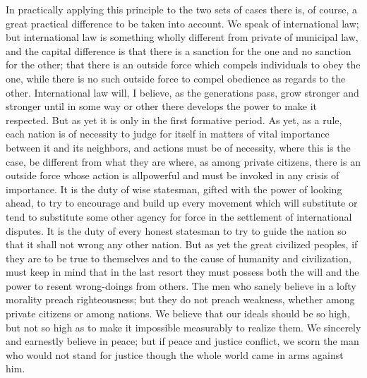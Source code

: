 \documentclass{scrbook}
\begin{document}
In practically applying this principle to the two sets of cases there is, of course, a great
practical difference to be taken into account. We speak of international law; but international law is something wholly different from private of municipal law, and the capital
difference is that there is a sanction for the one and no sanction for the other; that there is
an outside force which compels individuals to obey the one, while there is no such outside
force to compel obedience as regards to the other. International law will, I believe, as the
generations pass, grow stronger and stronger until in some way or other there develops the
power to make it respected. But as yet it is only in the first formative period. As yet, as a
rule, each nation is of necessity to judge for itself in matters of vital importance between it
and its neighbors, and actions must be of necessity, where this is the case, be different from
what they are where, as among private citizens, there is an outside force whose action is allpowerful and must be invoked in any crisis of importance. It is the duty of wise statesman,
gifted with the power of looking ahead, to try to encourage and build up every movement
which will substitute or tend to substitute some other agency for force in the settlement of
international disputes. It is the duty of every honest statesman to try to guide the nation so
that it shall not wrong any other nation. But as yet the great civilized peoples, if they are
to be true to themselves and to the cause of humanity and civilization, must keep in mind
that in the last resort they must possess both the will and the power to resent wrong-doings
from others. The men who sanely believe in a lofty morality preach righteousness; but they
do not preach weakness, whether among private citizens or among nations. We believe
that our ideals should be so high, but not so high as to make it impossible measurably to
realize them. We sincerely and earnestly believe in peace; but if peace and justice conflict,
we scorn the man who would not stand for justice though the whole world came in arms
against him.
\end{document}
